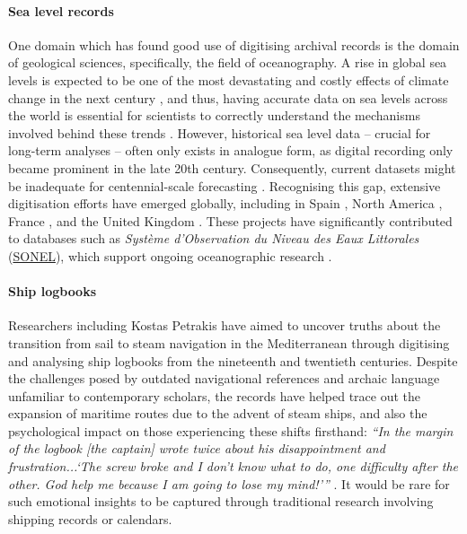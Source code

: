 \paragraph{Sea level records}{One domain which has found good use of digitising archival records is the domain of geological sciences, specifically, the field of oceanography. A rise in global sea levels is expected to be one of the most devastating and costly effects of climate change in the next century \parencite{mimura_2013_sea}, and thus, having accurate data on sea levels across the world is essential for scientists to correctly understand the mechanisms involved behind these trends \parencite{marcos_2011_cadiz}. However, historical sea level data -- crucial for long-term analyses -- often only exists in analogue form, as digital recording only became prominent in the late 20th century. Consequently, current datasets might be inadequate for centennial-scale forecasting \parencite{talke_2020_columbia_river}. Recognising this gap, extensive digitisation efforts have emerged globally, including in Spain \parencite{marcos_2011_cadiz, marcos_2013_tenerife, marcos_2021_spain}, North America \parencite{talke_2014_new_york, talke_2018_boston, talke_2020_columbia_river}, France \parencite{woppelmann_2014_marseille}, and the United Kingdom \parencite{inayatillah_2022_thames}. These projects have significantly contributed to databases such as \textit{Système d'Observation du Niveau des Eaux Littorales} (\href{https://www.sonel.org/?lang=en}{SONEL}), which support ongoing oceanographic research \parencite{lyszkowicz_2019_baltic}.}

\paragraph{Ship logbooks}{Researchers including Kostas Petrakis have aimed to uncover truths about the transition from sail to steam navigation in the Mediterranean through digitising and analysing ship logbooks from the nineteenth and twentieth centuries. Despite the challenges posed by outdated navigational references and archaic language unfamiliar to contemporary scholars, the records have helped trace out the expansion of maritime routes due to the advent of steam ships, and also the psychological impact on those experiencing these shifts firsthand: \textit{``In the margin of the logbook [the captain] wrote twice about his disappointment and frustration...`The screw broke and I don’t know what to do, one difficulty after the other. God help me because I am going to lose my mind!'''} \parencite{petrakis_2021_ship}. It would be rare for such emotional insights to be captured through traditional research involving shipping records or calendars.}

